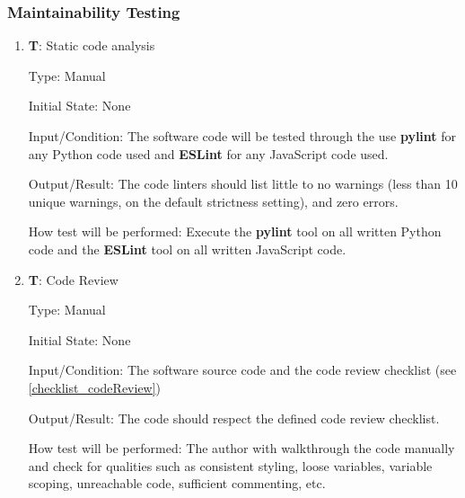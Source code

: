 \documentclass[12pt, titlepage]{article}
\newcounter{testnum} %
\begin{document}
\subsubsection{Maintainability Testing}
\begin{enumerate}

  \item{\textbf{T\thetestnum \label{T_linters}}: Static code analysis\\}

  Type: Manual
            
  Initial State: None
            
  Input/Condition: The software code will be tested through the use \textbf{pylint} for any
  Python code used and \textbf{ESLint} for any JavaScript code used.
            
  Output/Result: The code linters should list little to no 
  warnings (less than 10 unique warnings, on the default strictness setting), and zero errors.
            
  How test will be performed: Execute the \textbf{pylint} tool on all written Python code and 
  the \textbf{ESLint} tool on all written JavaScript code.

  \item{\textbf{T\thetestnum \label{T_codeReview}}: Code Review\\}

  Type: Manual
            
  Initial State: None
            
  Input/Condition: The software source code and the code review checklist (see \ref{checklist_codeReview})
            
  Output/Result: The code should respect the defined code review checklist.
            
  How test will be performed: The author with walkthrough the code manually and check for qualities
  such as consistent styling, loose variables, variable scoping, unreachable code, 
  sufficient commenting, etc.
  
\end{enumerate}
\end{document}
